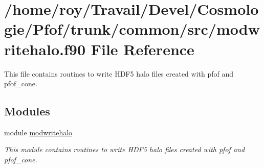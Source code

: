 \hypertarget{modwritehalo_8f90}{}\section{/home/roy/\+Travail/\+Devel/\+Cosmologie/\+Pfof/trunk/common/src/modwritehalo.f90 File Reference}
\label{modwritehalo_8f90}


This file contains routines to write H\+D\+F5 halo files created with pfof and pfof\+\_\+cone.  


\subsection*{Modules}
\begin{DoxyCompactItemize}
\item 
module \hyperlink{namespacemodwritehalo}{modwritehalo}
\begin{DoxyCompactList}\small\item\em This module contains routines to write H\+D\+F5 halo files created with pfof and pfof\+\_\+cone. \end{DoxyCompactList}\end{DoxyCompactItemize}
